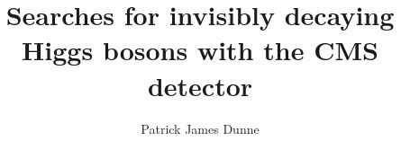 \documentclass{thesis}
\title{Searches for invisibly decaying Higgs bosons with the CMS detector}
\author{Patrick James Dunne}
\begin{document}
\begin{frontmatter}
  
\end{frontmatter}

\begin{mainmatter}
  
  
  
  
  
  
  

\end{mainmatter}

%  

\begin{backmatter}
  
\end{backmatter}

\end{document}

